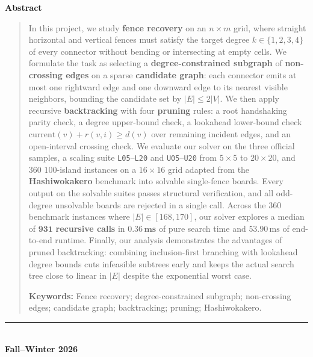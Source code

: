 \documentclass[10pt, a4paper]{article}
\newcommand{\code}[1]{\texttt{\color{primary!90!black}#1}}
\newcommand{\id}[1]{\ensuremath{\mathrm{#1}}}
\begin{document}
\begin{titlepage}
\vspace{0.8cm}
\begin{center}
    {\large\bfseries\color{primary} Abstract}
\end{center}
\vspace{-0.2em}
\begin{quote}
\small\noindent
In this project, we study \textbf{fence recovery} on an $n \times m$ grid, where straight horizontal and vertical fences must satisfy the target degree $k \in \{1,2,3,4\}$ of every connector without bending or intersecting at empty cells. We formulate the task as selecting a \textbf{degree-constrained subgraph} of \textbf{non-crossing edges} on a sparse \textbf{candidate graph}: each connector emits at most one rightward edge and one downward edge to its nearest visible neighbors, bounding the candidate set by $|E| \le 2|V|$. We then apply recursive \textbf{backtracking} with four \textbf{pruning} rules: a root handshaking parity check, a degree upper-bound check, a lookahead lower-bound check $\id{current}(v) + r(v,i) \ge d(v)$ over remaining incident edges, and an open-interval crossing check. We evaluate our solver on the three official samples, a scaling suite \code{L05}--\code{L20} and \code{U05}--\code{U20} from $5 \times 5$ to $20 \times 20$, and $360$ $100$-island instances on a $16 \times 16$ grid adapted from the \textbf{Hashiwokakero} benchmark into solvable single-fence boards. Every output on the solvable suites passes structural verification, and all odd-degree unsolvable boards are rejected in a single call. Across the $360$ benchmark instances where $|E| \in [168, 170]$, our solver explores a median of $\mathbf{931}$ \textbf{recursive calls} in $\mathbf{0.36\,\text{ms}}$ of pure search time and $53.90\,\text{ms}$ of end-to-end runtime. Finally, our analysis demonstrates the advantages of pruned backtracking: combining inclusion-first branching with lookahead degree bounds cuts infeasible subtrees early and keeps the actual search tree close to linear in $|E|$ despite the exponential worst case.

\vspace{0.55em}\noindent
{\color{primary}\textbf{Keywords:}} Fence recovery; degree-constrained subgraph; non-crossing edges; candidate graph; backtracking; pruning; Hashiwokakero.
\end{quote}

\vfill
\begin{center}
    {\color{accent!80}\rule{0.14\textwidth}{0.8pt}}\\[0.25cm]
    {\normalsize\bfseries\color{primary} Fall--Winter 2026}
\end{center}
\end{titlepage}
\end{document}
